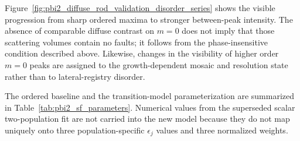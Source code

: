 Figure~\ref{fig:pbi2_diffuse_rod_validation_disorder_series} shows the visible
progression from sharp ordered maxima to stronger between-peak intensity.  The
absence of comparable diffuse contrast on $m=0$ does not imply that those
scattering volumes contain no faults; it follows from the phase-insensitive
condition described above.  Likewise, changes in the visibility of higher
order $m=0$ peaks are assigned to the growth-dependent mosaic and resolution
state rather than to lateral-registry disorder.

The ordered baseline and the transition-model parameterization are summarized
in Table~\ref{tab:pbi2_sf_parameters}.  Numerical values from the superseded
scalar two-population fit are not carried into the new model because they do
not map uniquely onto three population-specific $\epsilon_j$ values and three
normalized weights.

